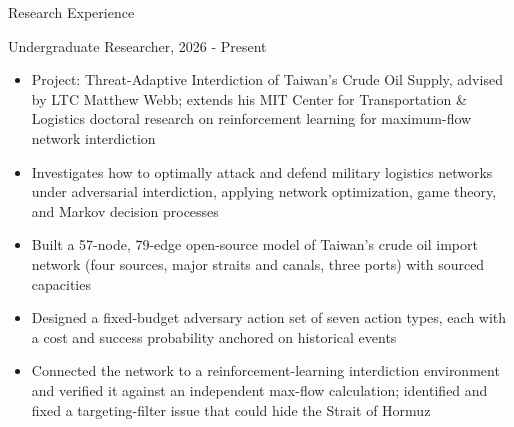 \documentclass{resume}
\begin{document}
\begin{rSection}{Research Experience}\itemsep -1pt

\begin{rSubsection}{Undergraduate Researcher, }{2026 - Present}{}
\vspace{-3pt}
\begin{itemize}
\setlength\itemsep{-1.5ex}
    \item Project: Threat-Adaptive Interdiction of Taiwan's Crude Oil Supply, advised by LTC Matthew Webb; extends his MIT Center for Transportation \& Logistics doctoral research on reinforcement learning for maximum-flow network interdiction
    \item Investigates how to optimally attack and defend military logistics networks under adversarial interdiction, applying network optimization, game theory, and Markov decision processes
    \item Built a 57-node, 79-edge open-source model of Taiwan's crude oil import network (four sources, major straits and canals, three ports) with sourced capacities
    \item Designed a fixed-budget adversary action set of seven action types, each with a cost and success probability anchored on historical events
    \item Connected the network to a reinforcement-learning interdiction environment and verified it against an independent max-flow calculation; identified and fixed a targeting-filter issue that could hide the Strait of Hormuz
\end{itemize}
\end{rSubsection}


\end{rSection}
\end{document}
